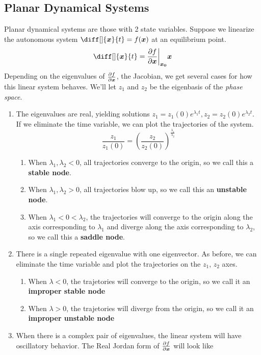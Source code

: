\subsection{Planar Dynamical Systems}
Planar dynamical systems are those with 2 state variables.
Suppose we linearize the autonomous system $\diff[]{\bs{x}}{t} = f(\bs{x})$ at an equilibrium point.
\[
	\diff[]{\bs{x}}{t} = \frac{\partial f}{\partial \bs{x}} \bigg\lvert_{\bs{x_0}}\bs{x} 
\]
Depending on the eigenvalues of $\frac{\partial f}{\partial \boldsymbol{x}}$, the Jacobian, we get several cases for
how this linear system behaves. We'll let $z_1$ and $z_2$ be the eigenbasis of
the \textit{phase space}.
\begin{enumerate}
	\item The eigenvalues are real, yielding solutions $z_1 = z_1(0)e^{\lambda_1
		t}, z_2 = z_2(0)e^{\lambda_2 t}$. If we eliminate the time variable, we can
		plot the trajectories of the system.
		\[
			\frac{z_1}{z_1(0)} = \left(\frac{z_2}{z_2(0)}\right)^{\frac{\lambda_1}{\lambda_2}}
		\]
		\begin{enumerate}
			\item When $\lambda_1, \lambda_2 < 0$, all trajectories converge to the origin, so we call this a \textbf{stable node}.
			\item When $\lambda_1, \lambda_2 > 0$, all trajectories blow up, so we call this an \textbf{unstable node}.
			\item When $\lambda_1 < 0 < \lambda_2$, the trajectories will converge to
				the origin along the axis corresponding to $\lambda_1$ and diverge along
				the axis corresponding to $\lambda_2$, so we call this a \textbf{saddle node}.
		\end{enumerate}
	\item There is a single repeated eigenvalue with one eigenvector. As before,
		we can eliminate the time variable and plot the trajectories on the $z_1$,
		$z_2$ axes.
		\begin{enumerate}
			\item When $\lambda < 0$, the trajetories will converge to the origin, so
				we call it an \textbf{improper stable node}
			\item When $\lambda > 0$, the trajetories will diverge from the origin, so
				we call it an \textbf{improper unstable node}
		\end{enumerate}
	\item When there is a complex pair of eigenvalues, the linear system will have
		oscillatory behavior. The Real Jordan form of $\frac{\partial f}{\partial \boldsymbol{x}}$ will look like \[
\]
\end{enumerate}
